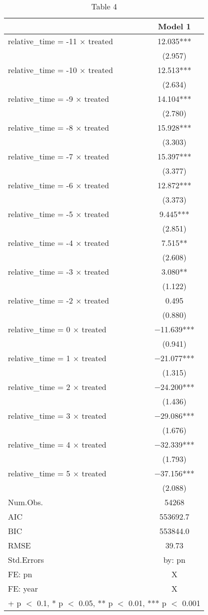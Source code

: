 \begin{table}

\caption{Table 4}
\centering
\begin{tabular}[t]{lc}
\toprule
  & Model 1\\
\midrule
relative\_time = -11 × treated & \num{12.035}***\\
 & (\num{2.957})\\
relative\_time = -10 × treated & \num{12.513}***\\
 & (\num{2.634})\\
relative\_time = -9 × treated & \num{14.104}***\\
 & (\num{2.780})\\
relative\_time = -8 × treated & \num{15.928}***\\
 & (\num{3.303})\\
relative\_time = -7 × treated & \num{15.397}***\\
 & (\num{3.377})\\
relative\_time = -6 × treated & \num{12.872}***\\
 & (\num{3.373})\\
relative\_time = -5 × treated & \num{9.445}***\\
 & (\num{2.851})\\
relative\_time = -4 × treated & \num{7.515}**\\
 & (\num{2.608})\\
relative\_time = -3 × treated & \num{3.080}**\\
 & (\num{1.122})\\
relative\_time = -2 × treated & \num{0.495}\\
 & (\num{0.880})\\
relative\_time = 0 × treated & \num{-11.639}***\\
 & (\num{0.941})\\
relative\_time = 1 × treated & \num{-21.077}***\\
 & (\num{1.315})\\
relative\_time = 2 × treated & \num{-24.200}***\\
 & (\num{1.436})\\
relative\_time = 3 × treated & \num{-29.086}***\\
 & (\num{1.676})\\
relative\_time = 4 × treated & \num{-32.339}***\\
 & (\num{1.793})\\
relative\_time = 5 × treated & \num{-37.156}***\\
 & (\num{2.088})\\
\midrule
Num.Obs. & \num{54268}\\
AIC & \num{553692.7}\\
BIC & \num{553844.0}\\
RMSE & \num{39.73}\\
Std.Errors & by: pn\\
FE: pn & X\\
FE: year & X\\
\bottomrule
\multicolumn{2}{l}{\rule{0pt}{1em}+ p $<$ 0.1, * p $<$ 0.05, ** p $<$ 0.01, *** p $<$ 0.001}\\
\end{tabular}
\end{table}
